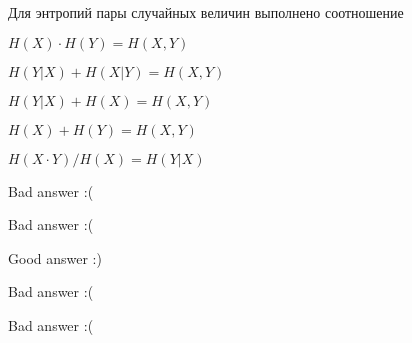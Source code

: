 
\begin{question}
Для энтропий пары случайных величин выполнено соотношение
\begin{answerlist}
  \item \(H(X) \cdot H(Y) = H(X, Y)\)
  \item \(H(Y|X) + H(X|Y) = H(X, Y)\)
  \item \(H(Y|X) + H(X) = H(X, Y)\)
  \item \(H(X) + H(Y) = H(X, Y)\)
  \item \(H(X\cdot Y) / H(X) = H(Y|X)\)
\end{answerlist}
\end{question}

\begin{solution}
\begin{answerlist}
  \item Bad answer :(
  \item Bad answer :(
  \item Good answer :)
  \item Bad answer :(
  \item Bad answer :(
\end{answerlist}
\end{solution}

